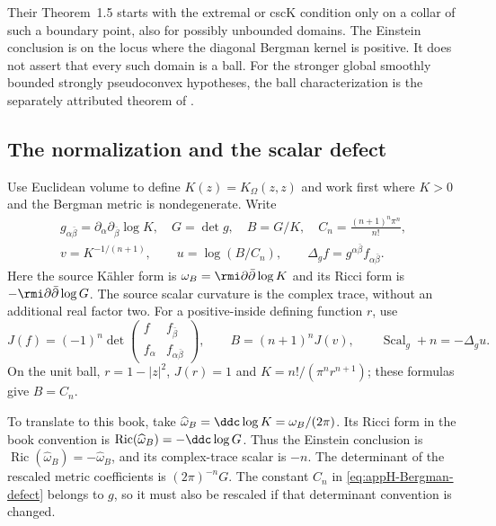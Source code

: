 Their Theorem~1.5 starts with the extremal or cscK condition only
on a collar of such a boundary point, also for possibly unbounded
domains. The Einstein conclusion is on the locus where the
diagonal Bergman kernel is positive. It does not assert that every
such domain is a ball. For the stronger global smoothly bounded
strongly pseudoconvex hypotheses, the ball characterization is the
separately attributed theorem of
\cite[Theorem~1.1]{HuangXiao21BergmanPublished}.

\subsection{The normalization and the scalar defect}
\label{sec:appH-Bergman-normalization}

Use Euclidean volume to define $K(z)=K_\Omega(z,z)$ and work first
where $K>0$ and the Bergman metric is nondegenerate. Write
\begin{equation*}
 \begin{gathered}
 g_{\alpha\bar\beta}=\partial_\alpha\partial_{\bar\beta}\log K,
 \quad G=\det g,\quad B=G/K,\quad
 C_n=\frac{(n+1)^n\pi^n}{n!},\\
 v=K^{-1/(n+1)},\qquad u=\log(B/C_n),\qquad
 \Delta_g f=g^{\alpha\bar\beta}f_{\alpha\bar\beta}.
 \end{gathered}
 \tag{H.34}\label{eq:appH-Bergman-defect}
\end{equation*}
Here the source K\"ahler form is
$\omega_B=\rmi\partial\bar\partial\log K$ and its Ricci form
is $-\rmi\partial\bar\partial\log G$. The source scalar curvature
is the complex trace, without an additional real factor two.
For a positive-inside defining function $r$, use
\begin{equation*}
 J(f)=(-1)^n\det
 \begin{pmatrix}f&f_{\bar\beta}\\ f_\alpha&f_{\alpha\bar\beta}\end{pmatrix},
 \qquad B=(n+1)^nJ(v),\qquad
 \operatorname{Scal}_g+n=-\Delta_g u.
 \tag{H.35}\label{eq:appH-Bergman-MA}
\end{equation*}
On the unit ball, $r=1-|z|^2$, $J(r)=1$ and
$K=n!/(\pi^n r^{n+1})$; these formulas give $B=C_n$.

To translate to this book, take
$\widehat\omega_B=\ddc\log K=\omega_B/(2\pi)$.
Its Ricci form in the book convention is
$\operatorname{Ric}(\widehat\omega_B)=-\ddc\log G$.
Thus the Einstein conclusion is
$\operatorname{Ric}(\widehat\omega_B)=-\widehat\omega_B$, and
its complex-trace scalar is $-n$. The determinant of the rescaled
metric coefficients is $(2\pi)^{-n}G$. The constant $C_n$ in
\eqref{eq:appH-Bergman-defect} belongs to $g$, so it must also be
rescaled if that determinant convention is changed.


